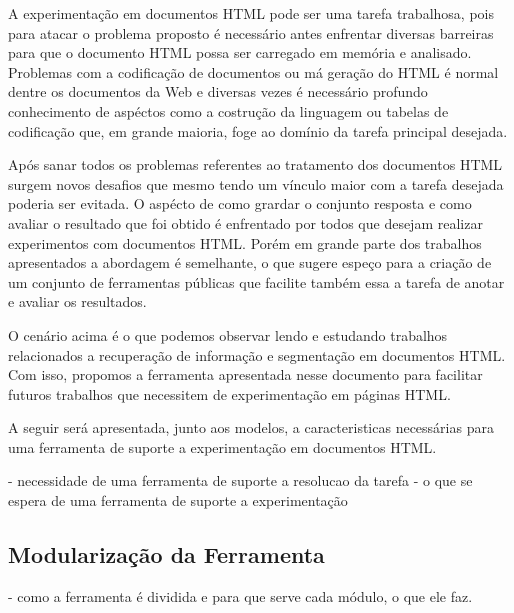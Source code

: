 \documentclass{acm_proc_article-sp}
\numberwithin{equation}{section}
\begin{document}
A experimentação em documentos HTML pode ser uma tarefa trabalhosa, pois
para atacar o problema proposto é necessário antes enfrentar diversas
barreiras para que o documento HTML possa ser carregado em memória e
analisado. Problemas com a codificação de documentos ou má geração do
HTML é normal dentre os documentos da Web e diversas vezes é necessário
profundo conhecimento de aspéctos como a costrução da linguagem ou
tabelas de codificação que, em grande maioria, foge ao domínio da tarefa
principal desejada.

Após sanar todos os problemas referentes ao tratamento dos documentos
HTML surgem novos desafios que mesmo tendo um vínculo maior com a tarefa
desejada poderia ser evitada. O aspécto de como grardar o conjunto
resposta e como avaliar o resultado que foi obtido é enfrentado por
todos que desejam realizar experimentos com documentos HTML. Porém em
grande parte dos trabalhos apresentados a abordagem é semelhante, o que
sugere espeço para a criação de um conjunto de ferramentas públicas que
facilite também essa a tarefa de anotar e avaliar os resultados.

O cenário acima é o que podemos observar lendo e estudando trabalhos
relacionados a recuperação de informação e segmentação em documentos
HTML. Com isso, propomos a ferramenta apresentada nesse documento para
facilitar futuros trabalhos que necessitem de experimentação em páginas
HTML.

A seguir será apresentada, junto aos modelos, a caracteristicas
necessárias para uma ferramenta de suporte a experimentação em
documentos HTML.

- necessidade de uma ferramenta de suporte a resolucao da tarefa
- o que se espera de uma ferramenta de suporte a experimentação

  \subsection{Modularização da Ferramenta}

- como a ferramenta é dividida e para que serve cada módulo, o que ele
faz.


\end{document}
